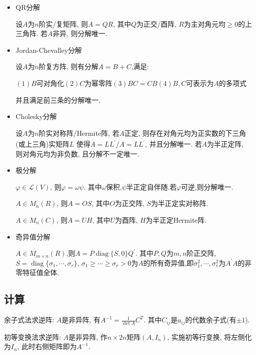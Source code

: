 \documentclass[UTF8]{ctexart}
\begin{document}
\begin{itemize}

	\item QR分解\par
	      设$A$为$n$阶实/复矩阵, 则$A=QR$, 其中$Q$为正交/酉阵, $R$为主对角元均$\geq 0$的上三角阵. 若$A$非异, 则分解唯一.

	\item Jordan-Chevalley分解\par
	      设$A$为$n$阶复方阵, 则有分解$A=B+C$,满足:\par
	      $(1)$$B$可对角化\qquad $(2)$$C$为幂零阵\qquad $(3)$$BC=CB$\qquad $(4)$$B,C$可表示为$A$的多项式\par
	      并且满足前三条的分解唯一.

	\item Cholesky分解\par
	      设$A$为$n$阶实对称阵/Hermite阵, 若$A$正定, 则存在对角元均为正实数的下三角(或上三角)实矩阵$L$
	      使得$A=LL^{\prime}$/$A=L\overline{L^{\prime}}$, 并且分解唯一.
	      若$A$为半正定阵, 则对角元均为非负数, 且分解不一定唯一.

	\item 极分解\par
	      $\varphi \in \mathcal{L}(V)$, 则$\varphi = \omega\psi$. 其中$\omega$保积,$\psi$半正定自伴随.若$\varphi $可逆,则分解唯一. \par
	      $A\in M_n(R)$, 则$A=OS$, 其中$O$为正交阵, $S$为半正定实对称阵.\par
	      $A\in M_n(C)$, 则$A=UH$, 其中$U$为酉阵, $H$为半正定Hermite阵.

	\item 奇异值分解\par
	      $A\in M_{m\times n}(R)$,则$A=P \operatorname{diag}\{S,0\}Q^{\prime}$.
	      其中$P,Q$为$m,n$阶正交阵,$S=\operatorname{diag}\{\sigma_1,\cdots ,\sigma_r\}$,
	      $\sigma_1\geq \cdots \geq \sigma_r>0$为$A$的所有奇异值,即$\sigma_1^2,\cdots,\sigma_r^2$为$A^{\prime}A$的非零特征值全体.

\end{itemize}


\subsection{计算}

余子式法求逆阵: $A$是非异阵, 有$A^{-1} = \frac{1}{\det A} C^T$.
其中$C_{ij}$是$a_{ij}$的代数余子式(有$\pm 1$).

初等变换法求逆阵: $A$是非异阵, 作$n\times 2n$矩阵$(A, I_n)$, 实施初等行变换,
将左侧化为$I_n$, 此时右侧矩阵即为$A^{-1}$.
\end{document}
